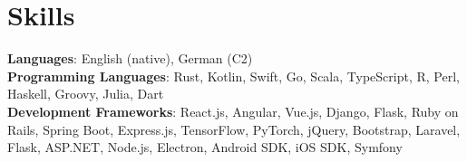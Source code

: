 \section{Skills}
    \begin{itemize}[leftmargin=0.15in, label={}]
	\small{\item{
		\textbf{Languages}{: English (native), German (C2)} \\ 
        \textbf{Programming Languages}{: Rust, Kotlin, Swift, Go, Scala, TypeScript, R, Perl, Haskell, Groovy, Julia, Dart} \\
		\textbf{Development Frameworks}{: React.js, Angular, Vue.js, Django, Flask, Ruby on Rails, Spring Boot, Express.js, TensorFlow, PyTorch, jQuery, Bootstrap, Laravel, Flask, ASP.NET, Node.js, Electron, Android SDK, iOS SDK, Symfony} \\
	}}
    \end{itemize}